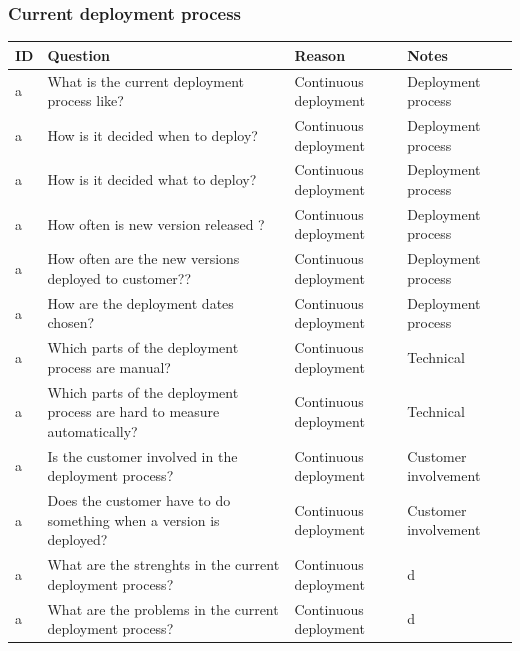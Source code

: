 \documentclass[english]{tktltiki2}
\theoremstyle{definition}
\theoremstyle{remark}
\begin{document}
\subsubsection{Current deployment process}

\begin{center}
    \begin{tabular}{ | l | l | l | p{5cm} |}
    \hline
    ID & Question & Reason & Notes \\ \hline
    a & What is the current deployment process like? & Continuous deployment & Deployment process \\ \hline
    a & How is it decided when to deploy? & Continuous deployment & Deployment process \\ \hline %
    a & How is it decided what to deploy? & Continuous deployment & Deployment process \\ \hline %
    a & How often is new version released ? & Continuous deployment & Deployment process \\ \hline
    a & How often are the new versions deployed to customer?? & Continuous deployment & Deployment process \\ \hline
    a & How are the deployment dates chosen? & Continuous deployment & Deployment process \\ \hline

    a & Which parts of the deployment process are manual? & Continuous deployment & Technical \\ \hline
    a & Which parts of the deployment process are hard to measure automatically? & Continuous deployment & Technical \\ \hline

    a & Is the customer involved in the deployment process? & Continuous deployment & Customer involvement \\ \hline
    a & Does the customer have to do something when a version is deployed? & Continuous deployment & Customer involvement \\ \hline

    a & What are the strenghts in the current deployment process? & Continuous deployment & d \\ \hline
    a & What are the problems in the current deployment process? & Continuous deployment & d \\ \hline
    \hline
    \end{tabular}
\end{center}
\end{document}
